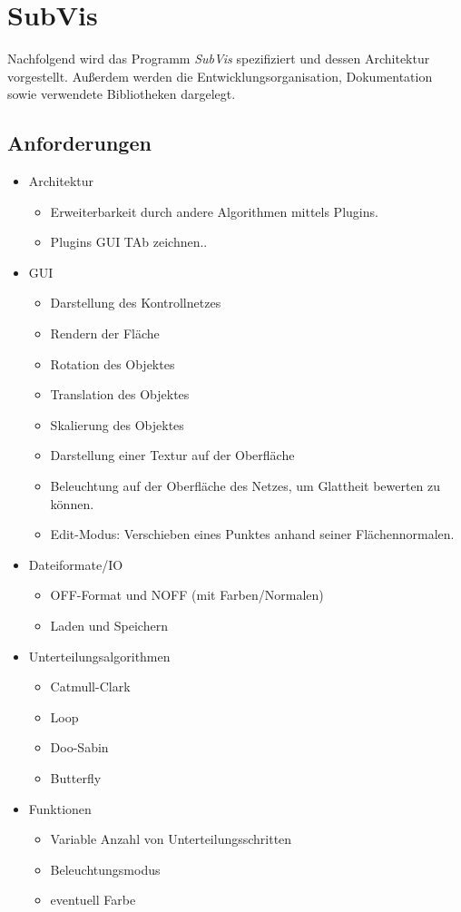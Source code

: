 \chapter{SubVis}

Nachfolgend wird das Programm \emph{SubVis} spezifiziert und dessen Architektur vorgestellt.
Außerdem werden die Entwicklungsorganisation, Dokumentation sowie verwendete Bibliotheken dargelegt.

\section{Anforderungen}

\begin{itemize}
 \item Architektur
 \begin{itemize}
 	\item Erweiterbarkeit durch andere Algorithmen mittels Plugins.
 	\item Plugins GUI TAb zeichnen..
 \end{itemize}
 \item GUI
  \begin{itemize}
 	\item Darstellung des Kontrollnetzes
 	\item Rendern der Fläche
 	\item Rotation des Objektes 
 	\item Translation des Objektes
 	\item Skalierung des Objektes
 	\item Darstellung einer Textur auf der Oberfläche
 	\item Beleuchtung auf der Oberfläche des Netzes, um Glattheit bewerten zu können.
 	\item Edit-Modus: Verschieben eines Punktes anhand seiner Flächennormalen.
 \end{itemize}
 \item Dateiformate/IO
 \begin{itemize}
 	\item OFF-Format und NOFF (mit Farben/Normalen)
 	\item Laden und Speichern
 \end{itemize}
 \item Unterteilungsalgorithmen
 \begin{itemize}
 	\item Catmull-Clark
 	\item Loop
 	\item Doo-Sabin
 	\item Butterfly
 \end{itemize}
 \item Funktionen
 \begin{itemize}
  \item Variable Anzahl von Unterteilungsschritten
  \item Beleuchtungsmodus
  \item eventuell Farbe
 \end{itemize}
\end{itemize}

